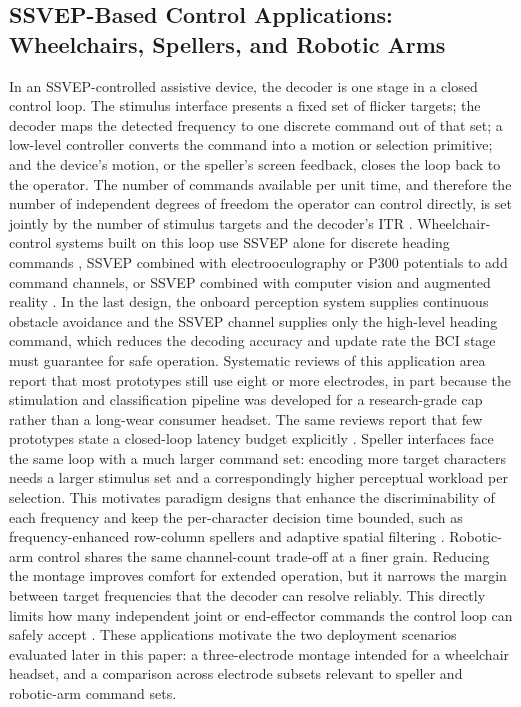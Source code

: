 \documentclass[11pt,a4paper,twoside,asymmetric]{article}
\begin{document}
\subsection{SSVEP-Based Control Applications: Wheelchairs, Spellers, and Robotic Arms}
In an SSVEP-controlled assistive device, the decoder is one stage in a closed control loop. The stimulus interface presents a fixed set of flicker targets; the decoder maps the detected frequency to one discrete command out of that set; a low-level controller converts the command into a motion or selection primitive; and the device's motion, or the speller's screen feedback, closes the loop back to the operator. The number of commands available per unit time, and therefore the number of independent degrees of freedom the operator can control directly, is set jointly by the number of stimulus targets and the decoder's ITR \cite{R4,R5}. Wheelchair-control systems built on this loop use SSVEP alone for discrete heading commands \cite{R3,R6}, SSVEP combined with electrooculography \cite{R2} or P300 potentials \cite{R7} to add command channels, or SSVEP combined with computer vision and augmented reality \cite{R7,R8}. In the last design, the onboard perception system supplies continuous obstacle avoidance and the SSVEP channel supplies only the high-level heading command, which reduces the decoding accuracy and update rate the BCI stage must guarantee for safe operation. Systematic reviews of this application area report that most prototypes still use eight or more electrodes, in part because the stimulation and classification pipeline was developed for a research-grade cap rather than a long-wear consumer headset. The same reviews report that few prototypes state a closed-loop latency budget explicitly \cite{R10,R11}. Speller interfaces face the same loop with a much larger command set: encoding more target characters needs a larger stimulus set and a correspondingly higher perceptual workload per selection. This motivates paradigm designs that enhance the discriminability of each frequency and keep the per-character decision time bounded, such as frequency-enhanced row-column spellers \cite{R4} and adaptive spatial filtering \cite{R5}. Robotic-arm control shares the same channel-count trade-off at a finer grain. Reducing the montage improves comfort for extended operation, but it narrows the margin between target frequencies that the decoder can resolve reliably. This directly limits how many independent joint or end-effector commands the control loop can safely accept \cite{R9}. These applications motivate the two deployment scenarios evaluated later in this paper: a three-electrode montage intended for a wheelchair headset, and a comparison across electrode subsets relevant to speller and robotic-arm command sets.
\end{document}
